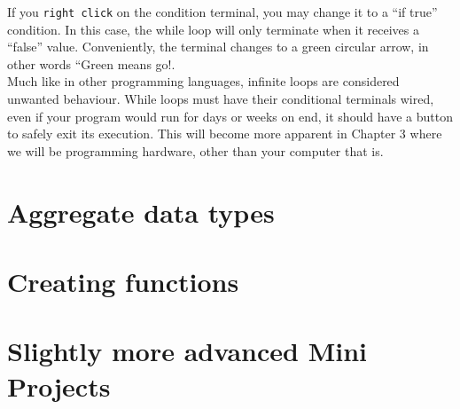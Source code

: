 If you \texttt{right click} on the condition terminal, you may change it to a ``if true'' condition. In this case, the while loop will only terminate when it receives a ``false'' value. Conveniently, the terminal changes to a green circular arrow, in other words ``Green means go!.\\

Much like in other programming languages, infinite loops are considered unwanted behaviour. While loops must have their conditional terminals wired, even if your program would run for days or weeks on end, it should have a button to safely exit its execution. This will become more apparent in Chapter 3 where we will be programming hardware, other than your computer that is.
\section{Aggregate data types}

\section{Creating functions}

\section{Slightly more advanced Mini Projects}